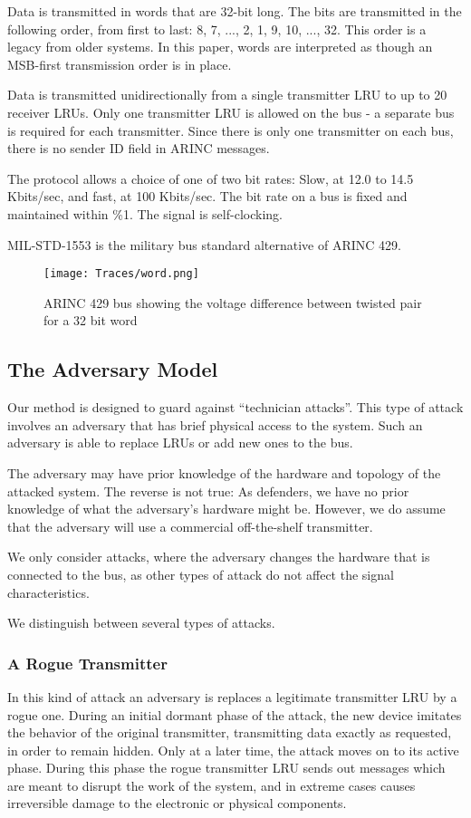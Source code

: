 \documentclass[conference]{IEEEtran}
\begin{document}
  Data is transmitted in words that are 32-bit long. The bits are transmitted in the following order, from first to last: 8, 7, ..., 2, 1, 9, 10, ..., 32. This order is a legacy from older systems. In this paper, words are interpreted as though an MSB-first transmission order is in place.
  
  Data is transmitted unidirectionally from a single transmitter LRU to up to 20 receiver LRUs. Only one transmitter LRU is allowed on the bus - a separate bus is required for each transmitter. Since there is only one transmitter on each bus, there is no sender ID field in ARINC messages.
   
  The protocol allows a choice of one of two bit rates: Slow, at 12.0 to 14.5 Kbits/sec, and fast, at 100 Kbits/sec. The bit rate on a bus is fixed and maintained within \%1. The signal is self-clocking.
  
  MIL-STD-1553 \cite{} is the military bus standard alternative of ARINC 429.
  
  \begin{figure}[t]
    \centering
    \texttt{[image: Traces/word.png]}
    \caption{ARINC 429 bus showing the voltage difference between twisted pair for a 32 bit word}
    \label{fig:word_example}
  \end{figure}
  
\subsection{The Adversary Model}
  Our method is designed to guard against ``technician attacks''. This type of attack involves an adversary that has brief physical access to the system. Such an adversary is able to replace LRUs or add new ones to the bus.
  
  The adversary may have prior knowledge of the hardware and topology of the attacked system. The reverse is not true: As defenders, we have no prior knowledge of what the adversary's hardware might be. However, we do assume that the adversary will use a commercial off-the-shelf transmitter.
  
  We only consider attacks, where the adversary changes the hardware that is connected to the bus, as other types of attack do not affect the signal characteristics.
  
  We distinguish between several types of attacks.

\subsubsection{A Rogue Transmitter}
  In this kind of attack an adversary is replaces a legitimate transmitter LRU by a rogue one. During an initial dormant phase of the attack, the new device imitates the behavior of the original transmitter, transmitting data exactly as requested, in order to remain hidden. Only at a later time, the attack moves on to its active phase. During this phase the rogue transmitter LRU sends out messages which are meant to disrupt the work of the system, and in extreme cases causes irreversible damage to the electronic or physical components.
  
\end{document}
